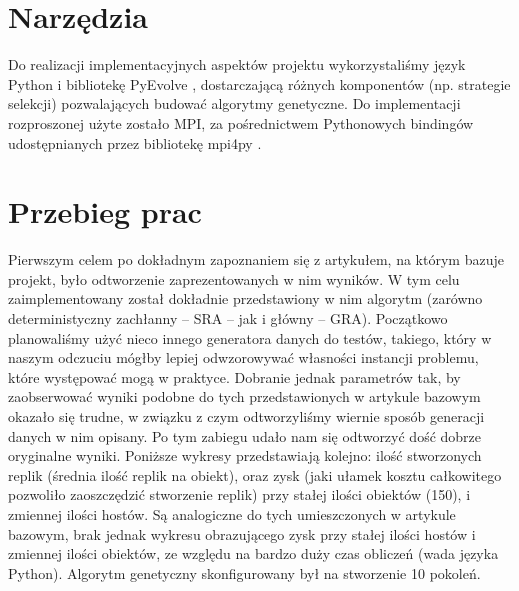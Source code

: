 \documentclass[11pt,pdftex,a4paper]{scrartcl}
\begin{document}
\section{Narzędzia}
Do realizacji implementacyjnych aspektów projektu wykorzystaliśmy język Python i bibliotekę
PyEvolve \cite{pyevolve}, dostarczającą różnych komponentów (np. strategie selekcji) pozwalających
budować algorytmy genetyczne. Do implementacji rozproszonej użyte zostało MPI, za pośrednictwem
Pythonowych bindingów udostępnianych przez bibliotekę mpi4py \cite{mpi4py}.

\section{Przebieg prac}
Pierwszym celem po dokładnym zapoznaniem się z artykułem, na którym bazuje projekt, było odtworzenie
zaprezentowanych w nim wyników. W tym celu zaimplementowany został dokładnie przedstawiony w nim
algorytm (zarówno deterministyczny zachłanny -- SRA -- jak i główny -- GRA). Początkowo planowaliśmy
użyć nieco innego generatora danych do testów, takiego, który w naszym odczuciu mógłby lepiej
odwzorowywać własności instancji problemu, które występować mogą w praktyce. Dobranie jednak parametrów
tak, by zaobserwować wyniki podobne do tych przedstawionych w artykule bazowym okazało się trudne,
w związku z czym odtworzyliśmy wiernie sposób generacji danych w nim opisany. Po tym zabiegu
udało nam się odtworzyć dość dobrze oryginalne wyniki. Poniższe wykresy przedstawiają kolejno: ilość 
stworzonych replik (średnia ilość replik na obiekt), oraz zysk (jaki ułamek kosztu całkowitego
pozwoliło zaoszczędzić stworzenie replik) przy stałej ilości obiektów (150), i zmiennej ilości
hostów. Są analogiczne do tych umieszczonych w artykule bazowym, brak jednak wykresu obrazującego
zysk przy stałej ilości hostów i zmiennej ilości obiektów, ze względu na bardzo duży czas obliczeń
(wada języka Python). Algorytm genetyczny skonfigurowany był na stworzenie 10 pokoleń.
\end{document}
